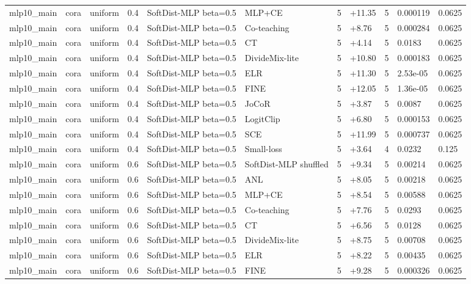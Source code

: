 \begin{table}[t]
\begin{tabular}{llllllrlrll}
mlp10_main & cora & uniform & 0.4 & SoftDist-MLP beta=0.5 & MLP+CE & 5 & +11.35 & 5 & 0.000119 & 0.0625 \\
mlp10_main & cora & uniform & 0.4 & SoftDist-MLP beta=0.5 & Co-teaching & 5 & +8.76 & 5 & 0.000284 & 0.0625 \\
mlp10_main & cora & uniform & 0.4 & SoftDist-MLP beta=0.5 & CT & 5 & +4.14 & 5 & 0.0183 & 0.0625 \\
mlp10_main & cora & uniform & 0.4 & SoftDist-MLP beta=0.5 & DivideMix-lite & 5 & +10.80 & 5 & 0.000183 & 0.0625 \\
mlp10_main & cora & uniform & 0.4 & SoftDist-MLP beta=0.5 & ELR & 5 & +11.30 & 5 & 2.53e-05 & 0.0625 \\
mlp10_main & cora & uniform & 0.4 & SoftDist-MLP beta=0.5 & FINE & 5 & +12.05 & 5 & 1.36e-05 & 0.0625 \\
mlp10_main & cora & uniform & 0.4 & SoftDist-MLP beta=0.5 & JoCoR & 5 & +3.87 & 5 & 0.0087 & 0.0625 \\
mlp10_main & cora & uniform & 0.4 & SoftDist-MLP beta=0.5 & LogitClip & 5 & +6.80 & 5 & 0.000153 & 0.0625 \\
mlp10_main & cora & uniform & 0.4 & SoftDist-MLP beta=0.5 & SCE & 5 & +11.99 & 5 & 0.000737 & 0.0625 \\
mlp10_main & cora & uniform & 0.4 & SoftDist-MLP beta=0.5 & Small-loss & 5 & +3.64 & 4 & 0.0232 & 0.125 \\
mlp10_main & cora & uniform & 0.6 & SoftDist-MLP beta=0.5 & SoftDist-MLP shuffled & 5 & +9.34 & 5 & 0.00214 & 0.0625 \\
mlp10_main & cora & uniform & 0.6 & SoftDist-MLP beta=0.5 & ANL & 5 & +8.05 & 5 & 0.00218 & 0.0625 \\
mlp10_main & cora & uniform & 0.6 & SoftDist-MLP beta=0.5 & MLP+CE & 5 & +8.54 & 5 & 0.00588 & 0.0625 \\
mlp10_main & cora & uniform & 0.6 & SoftDist-MLP beta=0.5 & Co-teaching & 5 & +7.76 & 5 & 0.0293 & 0.0625 \\
mlp10_main & cora & uniform & 0.6 & SoftDist-MLP beta=0.5 & CT & 5 & +6.56 & 5 & 0.0128 & 0.0625 \\
mlp10_main & cora & uniform & 0.6 & SoftDist-MLP beta=0.5 & DivideMix-lite & 5 & +8.75 & 5 & 0.00708 & 0.0625 \\
mlp10_main & cora & uniform & 0.6 & SoftDist-MLP beta=0.5 & ELR & 5 & +8.22 & 5 & 0.00435 & 0.0625 \\
mlp10_main & cora & uniform & 0.6 & SoftDist-MLP beta=0.5 & FINE & 5 & +9.28 & 5 & 0.000326 & 0.0625 \\

\end{tabular}
\end{table}
